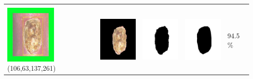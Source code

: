 \begin{table}[H]
\begin{tabular}{|m{1.0in}|m{1.0in}|m{1.0in}|m{1.0in}|m{0.6in}|}
		&  &  & \\
		\includegraphics[width=1.0in]{gambar/hasil_segmentasi/luka_kuning/image_10_rect.jpg} {\centering\fontsize{10}{10}\selectfont(106,63,137,261)}&
		\includegraphics[width=1.0in]{gambar/hasil_segmentasi/luka_kuning/result_10.jpg}&
		\includegraphics[width=1.0in]{gambar/hasil_segmentasi/luka_kuning/mask_r_10.jpg}&
		\includegraphics[width=1.0in]{gambar/hasil_segmentasi/luka_kuning/10_r.jpg}&
		94.5 \% \\
		\hline


\end{tabular}
\end{table}

